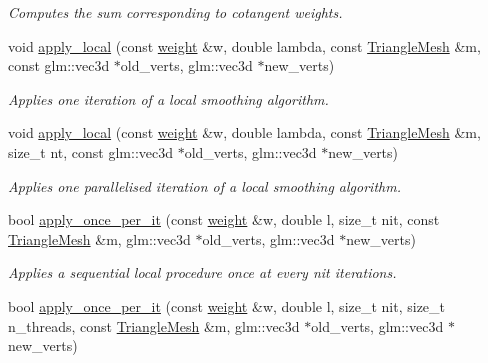 \begin{DoxyCompactItemize}
\begin{DoxyCompactList}\small\item\em Computes the sum corresponding to cotangent weights. \end{DoxyCompactList}\item 
void \hyperlink{namespacegeoproc_1_1smoothing_1_1local__private_a2a4d35025db072c097158a3e0f0a39b9}{apply\+\_\+local} (const \hyperlink{namespacegeoproc_a12e5a10581b53b9dd9a509127527f843}{weight} \&w, double lambda, const \hyperlink{classgeoproc_1_1TriangleMesh}{Triangle\+Mesh} \&m, const glm\+::vec3d $\ast$old\+\_\+verts, glm\+::vec3d $\ast$new\+\_\+verts)
\begin{DoxyCompactList}\small\item\em Applies one iteration of a local smoothing algorithm. \end{DoxyCompactList}\item 
void \hyperlink{namespacegeoproc_1_1smoothing_1_1local__private_a6c4720f8d8ac1d2ea577c46a41fa1c2f}{apply\+\_\+local} (const \hyperlink{namespacegeoproc_a12e5a10581b53b9dd9a509127527f843}{weight} \&w, double lambda, const \hyperlink{classgeoproc_1_1TriangleMesh}{Triangle\+Mesh} \&m, size\+\_\+t nt, const glm\+::vec3d $\ast$old\+\_\+verts, glm\+::vec3d $\ast$new\+\_\+verts)
\begin{DoxyCompactList}\small\item\em Applies one parallelised iteration of a local smoothing algorithm. \end{DoxyCompactList}\item 
bool \hyperlink{namespacegeoproc_1_1smoothing_1_1local__private_ab0216936b9f38434464d3db64e52abfa}{apply\+\_\+once\+\_\+per\+\_\+it} (const \hyperlink{namespacegeoproc_a12e5a10581b53b9dd9a509127527f843}{weight} \&w, double l, size\+\_\+t nit, const \hyperlink{classgeoproc_1_1TriangleMesh}{Triangle\+Mesh} \&m, glm\+::vec3d $\ast$old\+\_\+verts, glm\+::vec3d $\ast$new\+\_\+verts)
\begin{DoxyCompactList}\small\item\em Applies a sequential local procedure once at every {\itshape nit} iterations. \end{DoxyCompactList}\item 
bool \hyperlink{namespacegeoproc_1_1smoothing_1_1local__private_adb1d83b15a3ab776c37bc1ce823194de}{apply\+\_\+once\+\_\+per\+\_\+it} (const \hyperlink{namespacegeoproc_a12e5a10581b53b9dd9a509127527f843}{weight} \&w, double l, size\+\_\+t nit, size\+\_\+t n\+\_\+threads, const \hyperlink{classgeoproc_1_1TriangleMesh}{Triangle\+Mesh} \&m, glm\+::vec3d $\ast$old\+\_\+verts, glm\+::vec3d $\ast$new\+\_\+verts)

\end{DoxyCompactItemize}
